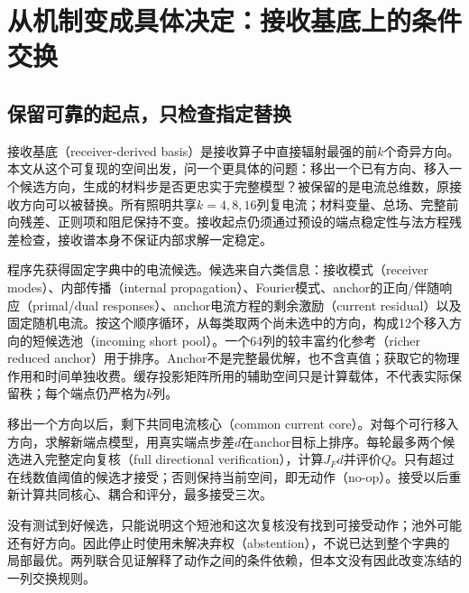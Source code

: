 \section{从机制变成具体决定：接收基底上的条件交换}
\subsection{保留可靠的起点，只检查指定替换}
接收基底（receiver-derived basis）是接收算子中直接辐射最强的前$k$个奇异方向。本文从这个可复现的空间出发，问一个更具体的问题：移出一个已有方向、移入一个候选方向，生成的材料步是否更忠实于完整模型？被保留的是电流总维数，原接收方向可以被替换。所有照明共享$k=4,8,16$列复电流；材料变量、总场、完整前向残差、正则项和阻尼保持不变。接收起点仍须通过预设的端点稳定性与法方程残差检查，接收谱本身不保证内部求解一定稳定。

程序先获得固定字典中的电流候选。候选来自六类信息：接收模式（receiver modes）、内部传播（internal propagation）、Fourier模式、anchor的正向/伴随响应（primal/dual responses）、anchor电流方程的剩余激励（current residual）以及固定随机电流。按这个顺序循环，从每类取两个尚未选中的方向，构成12个移入方向的短候选池（incoming short pool）。一个64列的较丰富约化参考（richer reduced anchor）用于排序。Anchor不是完整最优解，也不含真值；获取它的物理作用和时间单独收费。缓存投影矩阵所用的辅助空间只是计算载体，不代表实际保留秩；每个端点仍严格为$k$列。

移出一个方向以后，剩下共同电流核心（common current core）。对每个可行移入方向，求解新端点模型，用真实端点步差$d$在anchor目标上排序。每轮最多两个候选进入完整定向复核（full directional verification），计算$J_Fd$并评价$Q$。只有超过在线数值阈值的候选才接受；否则保持当前空间，即无动作（no-op）。接受以后重新计算共同核心、耦合和评分，最多接受三次。

没有测试到好候选，只能说明这个短池和这次复核没有找到可接受动作；池外可能还有好方向。因此停止时使用未解决弃权（abstention），不说已达到整个字典的局部最优。两列联合见证解释了动作之间的条件依赖，但本文没有因此改变冻结的一列交换规则。

